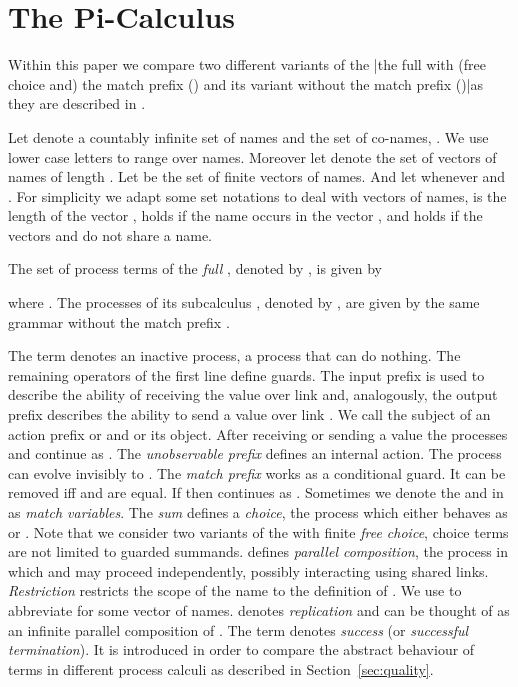 \documentclass[]{article}
\begin{document}
\section{The Pi-Calculus}
\label{sec:processCalculi}

Within this paper we compare two different variants of the \piCal|the full \piCal with (free choice and) the match prefix (\piT) and its variant without the match prefix (\piNM)|as they are described \eg in \cite{milnerParrowWalker92,Milner1999}.

Let  denote a countably infinite set of names and  the set of co-names, \ie . We use lower case letters  to range over names.
Moreover let  denote the set of vectors of names of length . Let  be the set of finite vectors of names. And let  whenever  and .
For simplicity we adapt some set notations to deal with vectors of names, \eg  is the length of the vector ,  holds if the name  occurs in the vector , and  holds if the vectors  and  do not share a name.

\begin{definition}[Syntax]
	The set of process terms of the \emph{full \piCal}, denoted by , is given by
	
	
	\noindent
	where .
	The processes of its subcalculus \piNM, denoted by , are given by the same grammar without the match prefix .
\end{definition}

\noindent
The term  denotes an inactive process, \ie a process that can do nothing.
The remaining operators of the first line define guards.
The input prefix  is used to describe the ability of receiving the value  over link  and, analogously, the output prefix  describes the ability to send a value  over link . We call  the subject of an action prefix  or  and  or  its object. After receiving or sending a value the processes  and  continue as .
The \emph{unobservable prefix}  defines an internal action. The process  can evolve invisibly to .
The \emph{match prefix}  works as a conditional guard. It can be removed iff  and  are equal. If  then  continues as .
Sometimes we denote the  and  in  as \emph{match variables}.
The \emph{sum}  defines a \emph{choice}, \ie the process which either behaves as  or . Note that we consider two variants of the \piCal with finite \emph{free choice}, \ie choice terms are not limited to guarded summands.
 defines \emph{parallel composition}, \ie the process in which  and  may proceed independently, possibly interacting using shared links.
\emph{Restriction}  restricts the scope of the name  to the definition of . We use  to abbreviate  for some vector  of names.
 denotes \emph{replication} and can be thought of as an infinite parallel composition of .
The term  denotes \emph{success} (or \emph{successful termination}). It is introduced in order to compare the abstract behaviour of terms in different process calculi as described in Section~\ref{sec:quality}.
\end{document}
